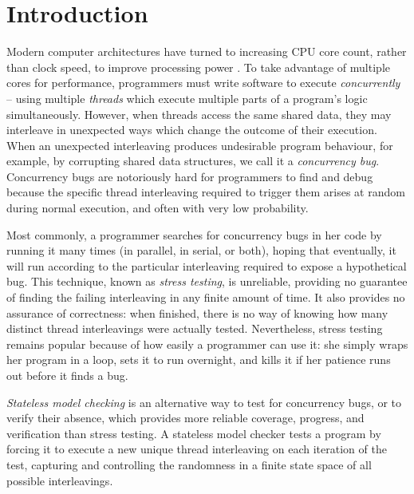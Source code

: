 \documentclass[12pt]{cmuthesis}
\begin{document}
\chapter{Introduction}

Modern computer architectures have turned to increasing CPU core count, rather than clock speed, to improve processing power \cite{mooreslaw}.
To take advantage of multiple cores for performance, programmers must write software to execute {\em concurrently} --
using multiple {\em threads} which execute multiple parts of a program's logic simultaneously.
However, when threads access the same shared data, they may interleave in unexpected ways which change the outcome of their execution.
When an unexpected interleaving produces undesirable program behaviour,
for example, by corrupting shared data structures,
we call it a {\em concurrency bug}.
Concurrency bugs are notoriously hard for programmers to find and debug
because the specific thread interleaving required to trigger them arises at random during normal execution,
and often with very low probability.

Most commonly, a programmer searches for concurrency bugs in her code by running it many times (in parallel, in serial, or both),
hoping that eventually, it will run according to the particular interleaving required to expose a hypothetical bug.
This technique, known as {\em stress testing}, is unreliable,
providing no guarantee of finding the failing interleaving in any finite amount of time.
It also provides no assurance of correctness:
when finished, there is no way of knowing how many distinct thread interleavings were actually tested.
Nevertheless, stress testing remains popular because of how easily a programmer can use it:
she simply wraps her program in a loop, sets it to run overnight, and kills it if her patience runs out before it finds a bug.

{\em Stateless model checking} \cite{verisoft} is an alternative way to test for concurrency bugs,
or to verify their absence,
which provides more reliable coverage, progress, and verification than stress testing.
A stateless model checker tests a program by forcing it to execute a new unique thread interleaving on each iteration of the test,
capturing and controlling the randomness in a finite state space of all possible interleavings.
\end{document}
